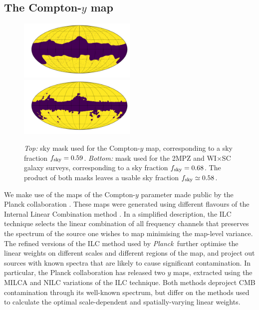 \documentclass[useAMS,usenatbib]{mn2e}
\newcommand{\wisc}{WI$\times$SC}
\def\planck{{\it Planck\/}}
\begin{document}
  \subsection{The Compton-$y$ map}\label{ssec:data.y}
    \begin{figure}
      \centering
      \includegraphics[width=0.5\textwidth]{mask_y.pdf}
      \includegraphics[width=0.5\textwidth]{mask_g.pdf}
      \caption{{\sl Top:} sky mask used for the Compton-$y$ map, corresponding to a sky fraction $f_{\rm sky}=0.59$. {\sl Bottom:} mask used for the 2MPZ and \wisc~ galaxy surveys, corresponding to a sky fraction $f_{\rm sky}=0.68$. The product of both masks leaves a usable sky fraction $f_{\rm sky}\simeq0.58$.
      }
      \label{fig:msk}
    \end{figure}
    We make use of the maps of the Compton-$y$ parameter made public by the Planck collaboration \citep{2016A&A...594A..22P}. These maps were generated using different flavours of the Internal Linear Combination method \citep{2004ApJ...612..633E,2008arXiv0811.4277V}. In a simplified description, the ILC technique selects the linear combination of all frequency channels that preserves the spectrum of the source one wishes to map minimising the map-level variance. The refined versions of the ILC method used by \planck\ further optimise the linear weights on different scales and different regions of the map, and project out sources with known spectra that are likely to cause significant contamination. In particular, the Planck collaboration has released two $y$ maps, extracted using the MILCA \citep{2013A&A...558A.118H} and NILC \citep{2011MNRAS.410.2481R} variations of the ILC technique. Both methods deproject CMB contamination through its well-known spectrum, but differ on the methods used to calculate the optimal scale-dependent and spatially-varying linear weights.
    
\end{document}
